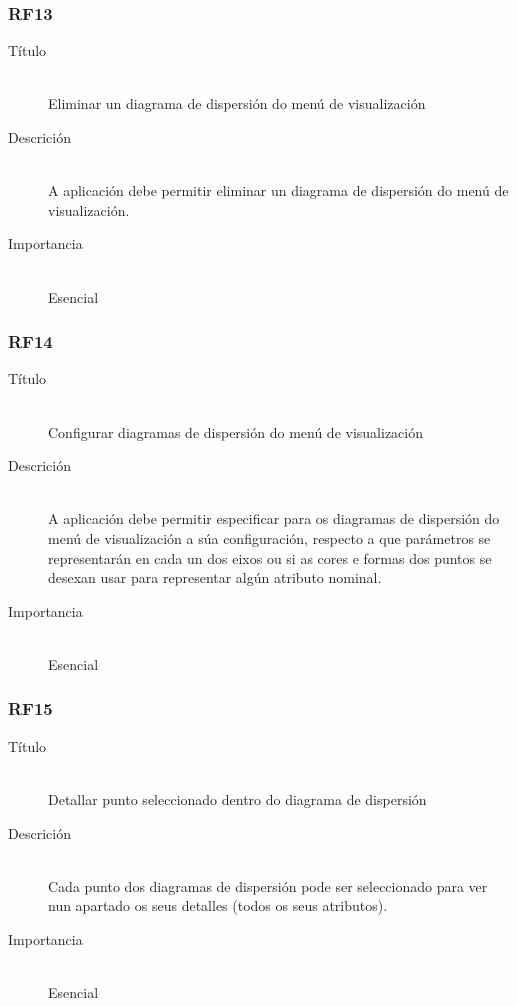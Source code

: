 \subsubsection*{RF13}
\begin{description}
\item[Título] \hfill \\
Eliminar un diagrama de dispersión do menú de visualización
\item[Descrición] \hfill \\
A aplicación debe permitir eliminar un diagrama de dispersión do menú de visualización.
\item[Importancia] \hfill \\
Esencial
\end{description}

\subsubsection*{RF14}
\begin{description}
\item[Título] \hfill \\
Configurar diagramas de dispersión do menú de visualización
\item[Descrición] \hfill \\
A aplicación debe permitir especificar para os diagramas de dispersión do menú de visualización a súa configuración, respecto a que parámetros se representarán en cada un dos eixos ou si as cores e formas dos puntos se desexan usar para representar algún atributo nominal.
\item[Importancia] \hfill \\
Esencial
\end{description}

\subsubsection*{RF15}
\begin{description}
\item[Título] \hfill \\
Detallar punto seleccionado dentro do diagrama de dispersión
\item[Descrición] \hfill \\
Cada punto dos diagramas de dispersión pode ser seleccionado para ver nun apartado os seus detalles (todos os seus atributos).
\item[Importancia] \hfill \\
Esencial
\end{description}

